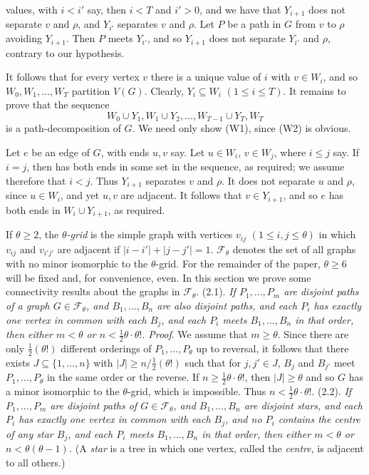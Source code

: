 \noindent values, with $i<i'$ say, then $i<T$ and $i'>0$, and we have that $Y_{i+1}$ does not
separate $v$ and $\rho$, and $Y_{i'}$ separates $v$ and $\rho$. Let $P$ be a path in $G$ from $v$ to $\rho$
avoiding $Y_{i+1}$. Then $P$ meets $Y_{i'}$, and so $Y_{i+1}$ does not separate $Y_{i'}$ and $\rho$,
contrary to our hypothesis.

It follows that for every vertex $v$ there is a unique value of $i$ with $v\in W_i$,
and so $W_0, W_1,..., W_T$ partition $V(G)$. Clearly, $Y_i\subseteq W_i$ $(1\le i\le T)$. It
remains to prove that the sequence
\begin{equation*}
W_0\cup Y_1, W_1\cup Y_2,..., W_{T-1}\cup Y_T, W_T
\end{equation*}
is a path-decomposition of $G$. We need only show (W1), since (W2) is
obvious.

Let $e$ be an edge of $G$, with ends $u, v$ say. Let $u\in W_i$, $v\in W_j$, where $i\le j$
say. If $i=j$, then \del{$\rho$} has both ends in some set in the sequence, as required;
we assume therefore that $i<j$. Thus $Y_{i+1}$ separates $v$ and $\rho$. It does not
separate $u$ and $\rho$, since $u\in W_i$, and yet $u, v$ are adjacent. It follows that
$v\in Y_{i+1}$, and so $e$ has both ends in $W_i\cup Y_{i+1}$, as required.


If $\theta\ge 2$, the \textit{$\theta$-grid} is the simple graph with vertices $v_{ij}$ $(1\le i, j\le\theta)$ in
which $v_{ij}$ and $v_{i'j'}$ are adjacent if $|i-i'|+|j-j'|=1$. $\mathscr{F}_\theta$ denotes the set of
all graphs with no minor isomorphic to the $\theta$-grid. For the remainder of the
paper, $\theta\ge 6$ will be fixed and, for convenience, even. In this section we prove
some connectivity results about the graphs in $\mathscr{F}_\theta$.
\stmt
(2.1). \textit{If $P_1,..., P_m$ are disjoint paths of a graph $G\in\mathscr{F}_\theta$, and $B_1,..., B_n$ are
also disjoint paths, and each $P_i$ has exactly one vertex in common with each
$B_j$, and each $P_i$ meets $B_1,..., B_n$ in that order, then either $m<\theta$ or
$n<\frac12\theta\cdot\theta!$.}
\stmt
\textit{Proof}. We assume that $m\ge\theta$. Since there are only $\frac12(\theta!)$ different
orderings of $P_1,..., P_\theta$ up to reversal, it follows that there exists $J\subseteq\{1,..., n\}$
with $|J|\ge n/\frac12(\theta!)$ such that for $j, j'\in J$, $B_j$ and $B_{j'}$ meet $P_1,..., P_\theta$ in the
same order or the reverse. If $n\ge\frac12\theta\cdot\theta!$, then $|J|\ge\theta$ and so $G$ has a minor
isomorphic to the $\theta$-grid, which is impossible. Thus $n<\frac12\theta\cdot\theta!$.
\stmt
(2.2). \textit{If $P_1,..., P_m$ are disjoint paths of $G\in\mathscr{F}_\theta$, and $B_1,..., B_n$ are disjoint
stars, and each $P_i$ has exactly one vertex in common with each $B_j$, and no $P_i$
contains the centre of any star $B_j$, and each $P_i$ meets $B_1,..., B_n$ in that order,
then either $m<\theta$ or $n<\theta(\theta-1)$.}
\stmt
(A \textit{star} is a tree in which one vertex, called the \textit{centre}, is adjacent to all
others.)

